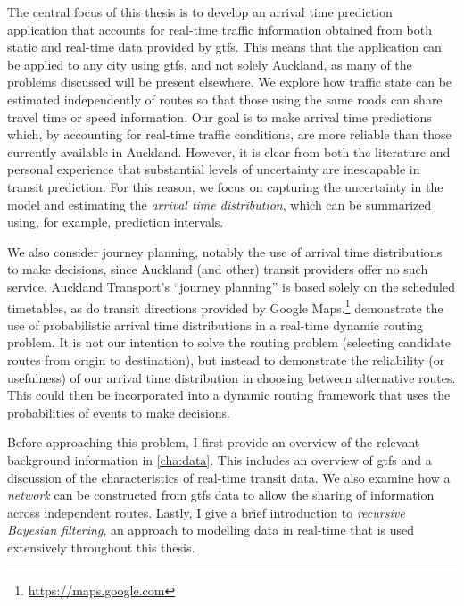 The central focus of this thesis is to develop an arrival time prediction application that accounts for real-time traffic information obtained from both static and real-time data provided by \gls{gtfs}. This means that the application can be applied to any city using \gls{gtfs}, and not solely Auckland, as many of the problems discussed will be present elsewhere. We explore how traffic state can be estimated independently of routes so that those using the same roads can share travel time or speed information. Our goal is to make arrival time predictions which, by accounting for real-time traffic conditions, are more reliable than those currently available in Auckland. However, it is clear from both the literature and personal experience that substantial levels of uncertainty are inescapable in transit prediction. For this reason, we focus on capturing the uncertainty in the model and estimating the \emph{arrival time distribution}, which can be summarized using, for example, prediction intervals.


We also consider journey planning, notably the use of arrival time distributions to make decisions, since Auckland (and other) transit providers offer no such service. Auckland Transport's ``journey planning'' is based solely on the scheduled timetables, as do transit directions provided by Google Maps.\footnote{\url{https://maps.google.com}}  demonstrate the use of probabilistic arrival time distributions in a real-time dynamic routing problem. It is not our intention to solve the routing problem (selecting candidate routes from origin to destination), but instead to demonstrate the reliability (or usefulness) of our arrival time distribution in choosing between alternative routes. This could then be incorporated into a dynamic routing framework that uses the probabilities of events to make decisions.


Before approaching this problem, I first provide an overview of the relevant background information in \cref{cha:data}. This includes an overview of \gls{gtfs} and a discussion of the characteristics of real-time transit data. We also examine how a \emph{network} can be constructed from \gls{gtfs} data to allow the sharing of information across independent routes. Lastly, I give a brief introduction to \emph{recursive Bayesian filtering}, an approach to modelling data in real-time that is used extensively throughout this thesis.


